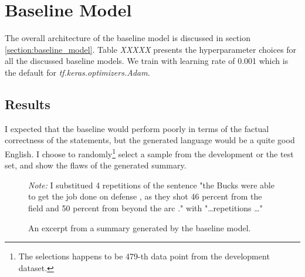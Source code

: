 \section{Baseline Model}

The overall architecture of the baseline model is discussed in section \ref{section:baseline_model}. Table \emph{XXXXX} presents the hyperparameter choices for all the discussed baseline models. We train with learning rate of 0.001 which is the default for \emph{tf.keras.optimizers.Adam}. 

\subsection{Results}

I expected that the baseline would perform poorly in terms of the factual correctness of the statements, but the generated language would be a quite good English. I choose to randomly\footnote{The selections happens to be 479-th data point from the development dataset.} select a sample from the development or the test set, and show the flaws of the generated summary.

\begin{figure}[h]
    \footnotesize{\textit{Note:} I substitued 4 repetitions of the sentence "the Bucks were able to get the job done on defense , as they shot 46 percent from the field and 50 percent from beyond the arc ." with "\dots repetitions \dots"}
    \caption{\centering An excerpt from a summary generated by the baseline model.} \label{baseline_no_reg_sum}
\end{figure}

